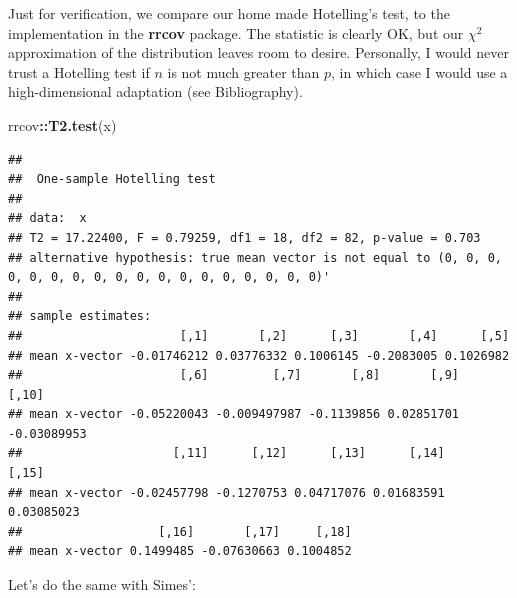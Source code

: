\documentclass[]{book}
\newenvironment{Shaded}{\begin{snugshade}}{\end{snugshade}}
\newcommand{\KeywordTok}[1]{\textcolor[rgb]{0.13,0.29,0.53}{\textbf{#1}}}
\newcommand{\DataTypeTok}[1]{\textcolor[rgb]{0.13,0.29,0.53}{#1}}
\newcommand{\DecValTok}[1]{\textcolor[rgb]{0.00,0.00,0.81}{#1}}
\newcommand{\StringTok}[1]{\textcolor[rgb]{0.31,0.60,0.02}{#1}}
\newcommand{\CommentTok}[1]{\textcolor[rgb]{0.56,0.35,0.01}{\textit{#1}}}
\newcommand{\ControlFlowTok}[1]{\textcolor[rgb]{0.13,0.29,0.53}{\textbf{#1}}}
\newcommand{\OperatorTok}[1]{\textcolor[rgb]{0.81,0.36,0.00}{\textbf{#1}}}
\newcommand{\NormalTok}[1]{#1}
\theoremstyle{definition}
\theoremstyle{definition}
\theoremstyle{definition}
\theoremstyle{remark}
\begin{document}
Just for verification, we compare our home made Hotelling's test, to the
implementation in the \textbf{rrcov} package. The statistic is clearly
OK, but our \(\chi^2\) approximation of the distribution leaves room to
desire. Personally, I would never trust a Hotelling test if \(n\) is not
much greater than \(p\), in which case I would use a high-dimensional
adaptation (see Bibliography).

\begin{Shaded}
\begin{Highlighting}[]
\NormalTok{rrcov}\OperatorTok{::}\KeywordTok{T2.test}\NormalTok{(x)}
\end{Highlighting}
\end{Shaded}

\begin{verbatim}
## 
##  One-sample Hotelling test
## 
## data:  x
## T2 = 17.22400, F = 0.79259, df1 = 18, df2 = 82, p-value = 0.703
## alternative hypothesis: true mean vector is not equal to (0, 0, 0, 0, 0, 0, 0, 0, 0, 0, 0, 0, 0, 0, 0, 0, 0, 0)' 
## 
## sample estimates:
##                      [,1]       [,2]      [,3]       [,4]      [,5]
## mean x-vector -0.01746212 0.03776332 0.1006145 -0.2083005 0.1026982
##                      [,6]         [,7]       [,8]       [,9]       [,10]
## mean x-vector -0.05220043 -0.009497987 -0.1139856 0.02851701 -0.03089953
##                     [,11]      [,12]      [,13]      [,14]      [,15]
## mean x-vector -0.02457798 -0.1270753 0.04717076 0.01683591 0.03085023
##                   [,16]       [,17]     [,18]
## mean x-vector 0.1499485 -0.07630663 0.1004852
\end{verbatim}

Let's do the same with Simes':

\begin{Shaded}
\end{Shaded}
\end{document}
